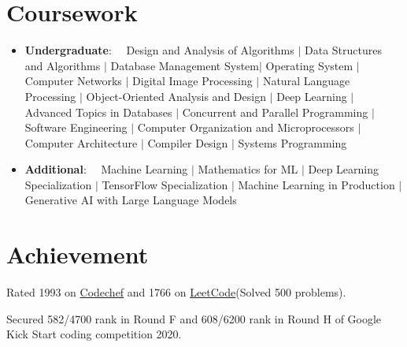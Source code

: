 \documentclass[a4paper,20pt]{article}
\newcommand{\resumeItem}[2]{
  \item\small{
    \textbf{#1}{: #2 \vspace{-2pt}}
  }
}
\newcommand{\resumeSubItem}[2]{\resumeItem{#1}{#2}\vspace{-3pt}}
\newcommand{\resumeSubHeadingListStart}{\begin{itemize}[leftmargin=*]}
\newcommand{\resumeSubHeadingListEnd}{\end{itemize}}
\begin{document}
\vspace{-3pt}
\section{Coursework}
	\resumeSubHeadingListStart
	\resumeSubItem{Undergraduate}{~~Design and Analysis of Algorithms $|$ Data Structures and Algorithms $|$ Database Management System$|$ Operating System $|$ Computer Networks $|$ Digital Image Processing $|$ Natural Language Processing $|$ Object-Oriented Analysis and Design $|$ Deep Learning $|$ Advanced Topics in Databases $|$ Concurrent and Parallel Programming $|$ Software Engineering $|$ Computer Organization and Microprocessors $|$ Computer Architecture $|$ Compiler Design $|$ Systems Programming}
	\resumeSubItem{Additional}{~~Machine Learning $|$ Mathematics for ML $|$ Deep Learning Specialization $|$ TensorFlow Specialization $|$ Machine Learning in Production $|$ Generative AI with Large Language Models} 
	\resumeSubHeadingListEnd

\vspace{-3pt}
\section{Achievement}
\begin{description}[font=$\bullet$]
\item {Rated 1993 on \href{https://www.codechef.com/users/khimrajsuthar}{Codechef} and 1766 on \href{https://leetcode.com/khimrajsuthar/}{LeetCode}(Solved 500 problems).}
\vspace{-5pt}
\item {Secured 582/4700 rank in Round F and 608/6200 rank in Round H of Google Kick Start coding competition 2020.}

\end{description}
\end{document}
